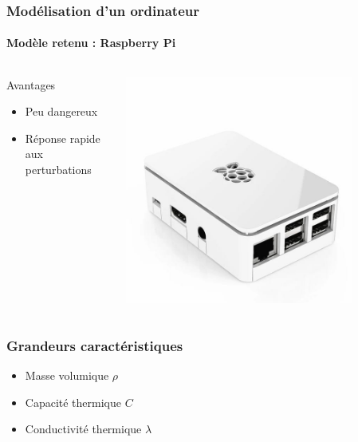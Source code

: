 \documentclass[a4paper,11pt]{beamer}
\begin{document}
\begin{frame}
    \frametitle{Modélisation d'un ordinateur}
    \framesubtitle{Modèle retenu : Raspberry Pi}

    \begin{columns}
        \begin{column}{0.5\textwidth}
            Avantages
            \begin{itemize}
                \item Peu dangereux
                \item Réponse rapide aux perturbations
            \end{itemize}
        \end{column}
        \begin{column}{0.5\textwidth}
            \includegraphics[width=0.8\textwidth]{raspberry_pi.jpg}
        \end{column}
    \end{columns}
\end{frame}

\begin{frame}
    \frametitle{Grandeurs caractéristiques}

    \begin{itemize}
        \item Masse volumique $\rho$
        \item Capacité thermique $C$
        \item Conductivité thermique $\lambda$
    \end{itemize}
\end{frame}
\end{document}
